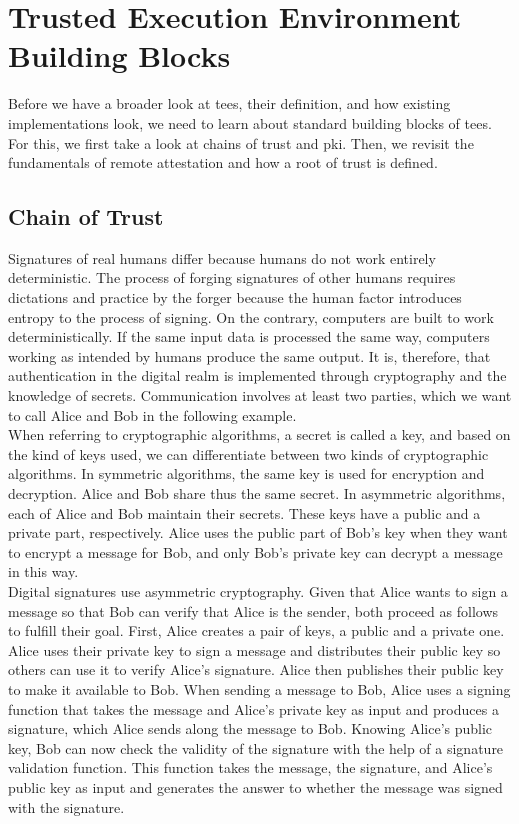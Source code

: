 \section{Trusted Execution Environment Building Blocks}
\label{sec:20:building_blocks}
Before we have a broader look at \glspl{tee}, their definition, and how existing
implementations look, we need to learn about standard building blocks of
\glspl{tee}. For this, we first take a look at chains of trust and \gls{pki}.
Then, we revisit the fundamentals of remote attestation and how a root of
trust is defined.

\subsection{Chain of Trust}
\label{sec:20:chain_of_trust}
Signatures of real humans differ because humans do not work entirely
deterministic. The process of forging signatures of other humans requires
dictations and practice by the forger because the human factor introduces
entropy to the process of signing. On the contrary, computers are built to work
deterministically. If the same input data is processed the same way, computers
working as intended by humans produce the same output. It is, therefore, that
authentication in the digital realm is implemented through cryptography and the
knowledge of secrets. Communication involves at least two parties, which we want
to call Alice and Bob in the following example.\\

When referring to cryptographic algorithms, a secret is called a key, and based
on the kind of keys used, we can differentiate between two kinds of
cryptographic algorithms. In symmetric algorithms, the same key is used for
encryption and decryption. Alice and Bob share thus the same secret. In
asymmetric algorithms, each of Alice and Bob maintain their secrets. These keys
have a public and a private part, respectively. Alice uses the public part of
Bob's key when they want to encrypt a message for Bob, and only Bob's private
key can decrypt a message in this way.\\

Digital signatures use asymmetric cryptography. Given that Alice wants to sign a
message so that Bob can verify that Alice is the sender, both proceed as follows
to fulfill their goal. First, Alice creates a pair of keys, a public and a
private one. Alice uses their private key to sign a message and distributes
their public key so others can use it to verify Alice's signature. Alice then
publishes their public key to make it available to Bob. When sending a message
to Bob, Alice uses a signing function that takes the message and Alice's private
key as input and produces a signature, which Alice sends along the message to
Bob. Knowing Alice's public key, Bob can now check the validity of the signature
with the help of a signature validation function. This function takes the
message, the signature, and Alice's public key as input and generates the answer
to whether the message was signed with the signature.\\

